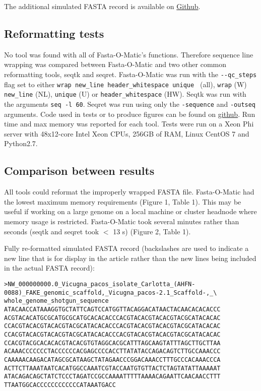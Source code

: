 \documentclass{bmcart}
\begin{document}
The additional simulated FASTA record is available on \href{https://github.com/kstatebioinfo/Fasta-O-Matic-a-tool-to-sanity-check-and-if-needed-reformat-FASTA-files/blob/master/simulated_unwrapped.fa}{Github}.

\subsection{Reformatting tests}
No tool was found with all of Fasta-O-Matic's functions. Therefore sequence line wrapping was compared between Fasta-O-Matic and two other common reformatting tools, seqtk and seqret. Fasta-O-Matic was run with the \verb|--qc_steps| flag set to either \verb|wrap new_line header_whitespace unique | (all), \verb|wrap| (W) \verb|new_line| (NL), \verb|unique| (U) or \verb|header_whitespace| (HW). Seqtk was run with the arguments \verb|seq -l 60|. Seqret was run using only the \verb|-sequence| and \verb|-outseq| arguments. Code used in tests or to produce figures can be found on \href{https://github.com/kstatebioinfo/Fasta-O-Matic-a-tool-to-sanity-check-and-if-needed-reformat-FASTA-files/tree/master/figures}{github}. Run time and max memory was reported for each tool. Tests were run on a Xeon Phi server with 48x12-core Intel Xeon CPUs, 256GB of RAM, Linux CentOS 7 and Python2.7.

\subsection{Comparison between results}

All tools could reformat the improperly wrapped FASTA file. Fasta-O-Matic had the lowest maximum memory requirements (Figure 1, Table 1). This may be useful if working on a large genome on a local machine or cluster headnode where memory usage is restricted. Fasta-O-Matic took several minutes rather than seconds (seqtk and seqret took $<$ 13 s) (Figure 2, Table 1). 

Fully re-formatted simulated FASTA record (backslashes are used to indicate a new line that is for display in the article rather than the new lines being included in the actual FASTA record):
\begin{verbatim}
>NW_000000000.0_Vicugna_pacos_isolate_Carlotta_(AHFN-0088)_FAKE_genomic_scaffold,_Vicugna_pacos-2.1_Scaffold-,_\
whole_genome_shotgun_sequence
ATACAACCATAAAGGTGCTATTCAGTCCATGGTTACAGGACATAACTACAACACACACCC
ACGTACACATGCGCATGCGCATGCACACACCCACGTACACGTACACGTACGCATACACAC
CCACGTACACGTACACGTACGCATACACACCCACGTACACGTACACGTACGCATACACAC
CCACGTACACGTACACGTACGCATACACACCCACGTACACGTACACGTACGCATACACAC
CCACGTACGCACACACGTACACGTGTAGGCACGCATTTAGCAAGTATTTAGCTTGCTTAA
ACAAACCCCCCCTACCCCCCACGAGCCCCACCTTATATACCAGACAGTCTTGCCAAACCC
CAAAAACAAGACATAGCGCATAAGCTATAGAACCCGGACAAACCTTTGCCCACAAACCCA
ACTTCTTAAATAATCACATGGCCAAATCGTACCAATGTGTTACTCTAGTATATTAAAAAT
ATACAGACAGCTATCTCCCTAGATCCGCCAAAATTTTTAAAACAGAATTCAACAACCTTT
TTAATGGCACCCCCCCCCCCCATAAATGACC
\end{verbatim}
\end{document}
